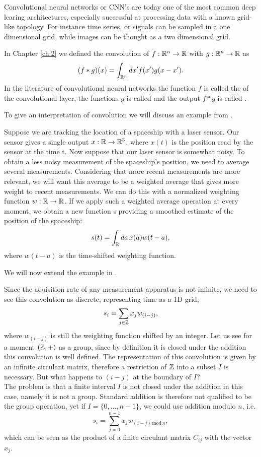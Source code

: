 \documentclass[../3.tex]{subfiles}
\begin{document}
    Convolutional neural networks or CNN's are today one of the most common deep learing architectures, especially successful at processing
    data with a known grid-like topology. For instance time series, or signals can be sampled in a one dimensional grid, while images can be thought as a two dimensional grid.
    
    In Chapter \ref{ch:2} we defined the convolution of $f:\mathbb{R}^n \to \mathbb{R}$ with $g:\mathbb{R}^n \to \mathbb{R}$ as
    \[ (f * g)(x) = \int_{\mathbb{R}^n} dx' f(x')g(x-x'). \]
    In the literature of convolutional neural networks the function $f$ is called the  of the
    convolutional layer, the functions $g$ is called  and the output $f*g$ is called .

    To give an interpretation of convolution we will discuss an example from \cite{deep}.

    \begin{exa}
        \label{exa:circ}
        Suppose we are tracking the location of a spaceship with a laser sensor. Our
        sensor gives a single output $x : \mathbb{R} \to \mathbb{R}^3$, where $x(t)$ is the position read by the sensor at the time t.
        Now suppose that our laser sensor is somewhat noisy. To obtain a less noisy
        measurement of the spaceship’s position, we need to average several measurements.
        Considering that more recent measurements are more relevant, we will want this average to
        be a weighted average that gives more weight to recent measurements. 
        We can do this with a normalized weighting function $w:\mathbb{R} \to \mathbb{R}$. If
        we apply such a weighted average operation at every moment, we obtain a new
        function s providing a smoothed estimate of the position of the spaceship:
        \[ s(t) = \int_{\mathbb{R}} da \, x(a)w(t-a), \]
        where $w(t-a)$ is the time-shifted weighting function.

        We will now extend the example in \cite{deep}.

        Since the aquisition rate of any measurement apparatus is not infinite, we need to see this convolution as discrete, representing time as a 1D grid,
        \[ s_i = \sum_{j \in \mathbb{Z}} x_j w_{(i-j)}, \]
        where $w_{(i-j)}$ is still the weighting function shifted by an integer.
        Let us see for a moment $(\mathbb{Z},+)$ as a group, since by definition it is closed under the addition this convolution is well defined.
        The representation of this convolution is given by an infinite circulant matrix, therefore a restriction of $\mathbb{Z}$
        into a subset $I$ is necessary. But what happens to $(i-j)$ at the boundary of $I$?\\
        The problem is that a finite interval $I$ is not closed under the addition in this case, namely it is not a group.
        Standard addition is therefore not qualified to be the group operation, yet if $I = \{ 0,\dots,n-1 \}$, we could use
        addition modulo $n$, i.e. 
        \[ s_i = \sum_{j = 0}^{n-1} x_j w_{(i-j) \, \text{mod} \, n},\]
        which can be seen as the product of a finite circulant matrix $C_{ij}$ with the vector $x_j$.
    \end{exa}
\end{document}
